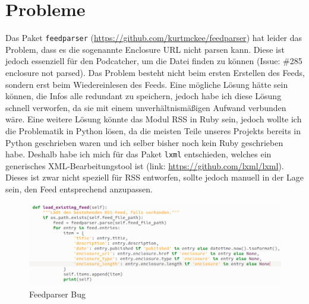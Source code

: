 \documentclass[a4paper,12pt]{article}
\begin{document}
\section{Probleme}
Das Paket \texttt{feedparser} (\url{https://github.com/kurtmckee/feedparser}) hat leider das Problem, dass es die sogenannte Enclosure URL nicht parsen kann. Diese ist jedoch essenziell für den Podcatcher, um die Datei finden zu können (Issue: \#285 enclosure not parsed). Das Problem besteht nicht beim ersten Erstellen des Feeds, sondern erst beim Wiedereinlesen des Feeds. Eine mögliche Lösung hätte sein können, die Infos alle redundant zu speichern, jedoch habe ich diese Lösung schnell verworfen, da sie mit einem unverhältnismäßigen Aufwand verbunden wäre. Eine weitere Lösung könnte das Modul RSS in Ruby sein, jedoch wollte ich die Problematik in Python lösen, da die meisten Teile unseres Projekts bereits in Python geschrieben waren und ich selber bisher noch kein Ruby geschrieben habe.
Deshalb habe ich mich für das Paket \texttt{lxml} entschieden, welches ein generisches XML-Bearbeitungstool ist (link: \url{https://github.com/lxml/lxml}). Dieses ist zwar nicht speziell für RSS entworfen, sollte jedoch manuell in der Lage sein, den Feed entsprechend anzupassen.
\newpage
\begin{figure}[H]
    \centering
    \includegraphics[width=1\linewidth]{Pics/BrokeFeedParser.png}
    \caption{Feedparser Bug}
    \label{fig:enter-label}
\end{figure}
\end{document}
